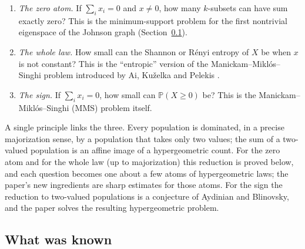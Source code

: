 \documentclass[11pt]{article}
\theoremstyle{remark}
\newcommand{\Prb}{\mathbb P}
\begin{document}
\begin{enumerate}
\item \emph{The zero atom.} If \(\sum_ix_i=0\) and \(x\ne0\), how many
\(k\)-subsets can have sum exactly zero? This is the minimum-support problem
for the first nontrivial eigenspace of the Johnson graph (Section~\ref{subsec:known}).
\item \emph{The whole law.} How small can the Shannon or R\'enyi entropy of
\(X\) be when \(x\) is not constant? This is the ``entropic'' version of the
Manickam--Mikl\'os--Singhi problem introduced by Ai, Ku\v{z}elka and Pelekis
\cite{AKP}.
\item \emph{The sign.} If \(\sum_ix_i=0\), how small can \(\Prb(X\ge0)\) be?
This is the Manickam--Mikl\'os--Singhi (MMS) problem itself.
\end{enumerate}

A single principle links the three. Every population is dominated, in a
precise majorization sense, by a population that takes only two values; the
sum of a two-valued population is an affine image of a hypergeometric count.
For the zero atom and for the whole law (up to majorization) this reduction is
proved below, and each question becomes one about a few atoms of
hypergeometric laws; the paper's new ingredients are sharp estimates for those
atoms. For the sign the reduction to two-valued populations is a conjecture of
Aydinian and Blinovsky, and the paper solves the resulting hypergeometric
problem.

\subsection{What was known}\label{subsec:known}
\end{document}
